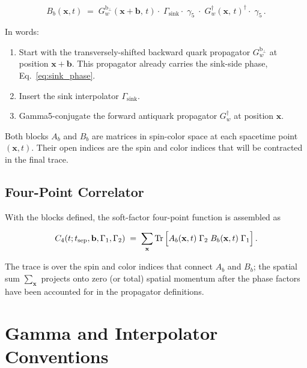 \documentclass[11pt,a4paper]{article}
\newcommand{\Gfive}{\gamma_{5}}
\begin{document}
\begin{equation}\label{eq:B_block}
B_{b}(\mathbf{x}, t) \;=\;
G_{w}^{\mathrm{b}_{\perp}}(\mathbf{x}+\mathbf{b},\,t)
\cdot\;
\Gamma_{\mathrm{sink}}
\cdot\;
\Gfive\;
\cdot\;
G_{w}^{\dagger}(\mathbf{x},\,t)^{\dagger}
\cdot\;
\Gfive\, .
\end{equation}

\noindent
In words:
\begin{enumerate}[nosep]
  \item Start with the transversely-shifted backward quark propagator
        $G_{w}^{\mathrm{b}_{\perp}}$ at position $\mathbf{x}+\mathbf{b}$.
        This propagator already carries the sink-side phase,
        Eq.~\eqref{eq:sink_phase}.
  \item Insert the sink interpolator $\Gamma_{\mathrm{sink}}$.
  \item Gamma5-conjugate the forward antiquark propagator $G_{w}^{\dagger}$
        at position $\mathbf{x}$.
\end{enumerate}

Both blocks $A_{b}$ and $B_{b}$ are matrices in spin-color space at each spacetime
point $(\mathbf{x}, t)$.  Their open indices are the spin and color indices that
will be contracted in the final trace.

\subsection{Four-Point Correlator}

With the blocks defined, the soft-factor four-point function is assembled as

\begin{equation}\label{eq:C4_full}
\begin{aligned}
C_{4}(t; t_{\mathrm{sep}}, \mathbf{b}, \Gamma_{1}, \Gamma_{2})
\;=\;
\sum_{\mathbf{x}}
\Tr\Big[
   A_{b}(\mathbf{x}, t)\;
   \Gamma_{2}\;
   B_{b}(\mathbf{x}, t)\;
   \Gamma_{1}
\Big]\, .
\end{aligned}
\end{equation}

The trace is over the spin and color indices that connect $A_{b}$ and $B_{b}$; the
spatial sum $\sum_{\mathbf{x}}$ projects onto zero (or total) spatial momentum after
the phase factors have been accounted for in the propagator definitions.

\section{Gamma and Interpolator Conventions}
\end{document}
